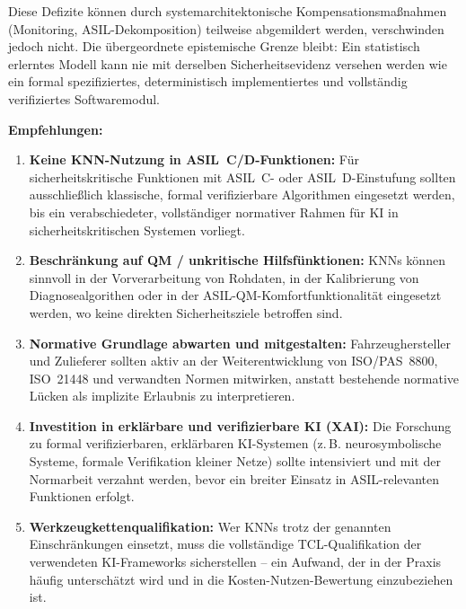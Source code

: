 ﻿\documentclass[12pt,a4paper]{article}
\begin{document}
Diese Defizite k\"onnen durch systemarchitektonische Kompensationsma\ss{}nahmen
(Monitoring, ASIL-Dekomposition) teilweise abgemildert werden, verschwinden jedoch
nicht. Die \"ubergeordnete epistemische Grenze bleibt: Ein statistisch erlerntes
Modell kann nie mit derselben Sicherheitsevidenz versehen werden wie ein formal
spezifiziertes, deterministisch implementiertes und vollst\"andig verifiziertes
Softwaremodul.

\bigskip
\noindent\textbf{Empfehlungen:}

\begin{enumerate}[itemsep=4pt]
  \item \textbf{Keine KNN-Nutzung in ASIL~C/D-Funktionen:} F\"ur sicherheitskritische
    Funktionen mit ASIL~C- oder ASIL~D-Einstufung sollten ausschlie\ss{}lich klassische,
    formal verifizierbare Algorithmen eingesetzt werden, bis ein verabschiedeter,
    vollst\"andiger normativer Rahmen f\"ur KI in sicherheitskritischen Systemen vorliegt.

  \item \textbf{Beschr\"ankung auf QM / unkritische Hilfsf\"unktionen:} KNNs k\"onnen
    sinnvoll in der Vorverarbeitung von Rohdaten, in der Kalibrierung von
    Diagnosealgorithen oder in der ASIL-QM-Komfortfunktionalit\"at eingesetzt werden,
    wo keine direkten Sicherheitsziele betroffen sind.

  \item \textbf{Normative Grundlage abwarten und mitgestalten:} Fahrzeughersteller
    und Zulieferer sollten aktiv an der Weiterentwicklung von ISO/PAS~8800,
    ISO~21448 und verwandten Normen mitwirken, anstatt bestehende normative L\"ucken
    als implizite Erlaubnis zu interpretieren.

  \item \textbf{Investition in erkl\"arbare und verifizierbare KI (XAI):} Die
    Forschung zu formal verifizierbaren, erkl\"arbaren KI-Systemen (z.\,B.
    neurosymbolische Systeme, formale Verifikation kleiner Netze) sollte
    intensiviert und mit der Normarbeit verzahnt werden, bevor ein breiter
    Einsatz in ASIL-relevanten Funktionen erfolgt.

  \item \textbf{Werkzeugkettenqualifikation:} Wer KNNs trotz der genannten
    Einschr\"ankungen einsetzt, muss die vollst\"andige TCL-Qualifikation der
    verwendeten KI-Frameworks sicherstellen -- ein Aufwand, der in der Praxis
    h\"aufig unterschätzt wird und in die Kosten-Nutzen-Bewertung einzubeziehen ist.
\end{enumerate}
\end{document}
